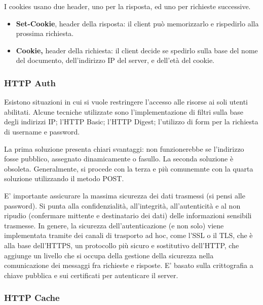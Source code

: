 \vspace{3mm}

I cookies usano due header, uno per la risposta, ed uno per richieste successive. 

\begin{itemize}
    \item
    \textbf{Set-Cookie}, header della risposta: il client può memorizzarlo e rispedirlo alla prossima richiesta.
    
    \item
    \textbf{Cookie,} header della richiesta: il client decide
    se spedirlo sulla base del nome del documento, dell’indirizzo IP del server, e dell’età del cookie.
\end{itemize}

\subsubsection{HTTP Auth}

Esistono situazioni in cui si vuole restringere l’accesso alle risorse ai soli utenti abilitati. Alcune tecniche utilizzate sono l'implementazione di filtri sulla base degli indirizzi IP; l'HTTP Basic; l'HTTP Digest; l'utilizzo di form per la richiesta di username e password.

\vspace{3mm}

La prima soluzione presenta chiari svantaggi: non funzionerebbe se l'indirizzo fosse pubblico, assegnato dinamicamente o fasullo. La seconda soluzione è obsoleta. Generalmente, si procede con la terza e più comunemnte con la quarta soluzione utilizzando il metodo POST.

\vspace{3mm}

E' importante assicurare la massima sicurezza dei dati trasmessi (si pensi alle password). Si punta alla confidenzialità, all'integrità, all'autenticità e al non ripudio (confermare mittente e destinatario dei dati) delle informazioni sensibili trasmesse. In genere, la sicurezza dell'autenticazione (e non solo) viene implementata tramite dei canali di trasporto ad hoc, come l'SSL o il TLS, che è alla base dell'HTTPS, un protocollo più sicuro e sostitutivo dell'HTTP, che aggiunge un livello che si occupa della gestione della sicurezza nella comunicazione dei messaggi fra richieste e risposte. E' basato sulla crittografia a chiave pubblica e sui certificati per autenticare il server.

\subsubsection{HTTP Cache}

